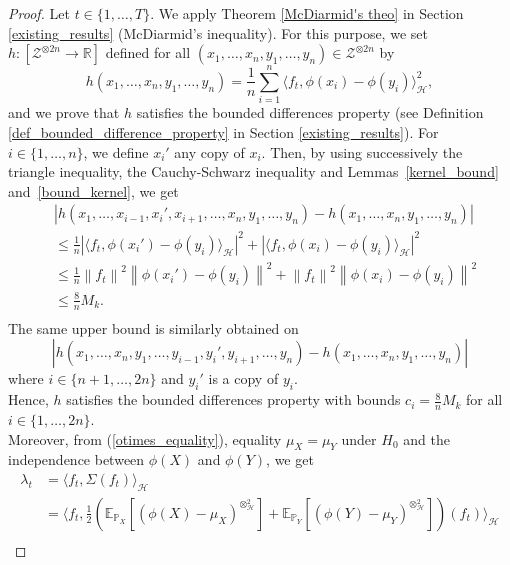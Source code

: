 \documentclass[twoside,11pt]{article}
\newcommand{\Hk}{\mathcal{H}}
\newcommand{\nb}{n}
\newcommand{\R}{\mathbb{R}}%
\newcommand{\PP}{\mathbb{P}}%
\newcommand{\EE}{\mathbb{E}}%
\begin{document}
\begin{proof}
Let $t \in \{1,\ldots,T\}$. We apply Theorem \ref{McDiarmid's theo} in Section \ref{existing_results} (McDiarmid's inequality). For this purpose, we set $h : [\mathcal{Z}^{\otimes 2\nb} \longrightarrow \R]$ defined for all $ \left(x_1,\ldots,x_{\nb},y_1,\ldots,y_{\nb}\right) \in \mathcal{Z}^{\otimes 2\nb}$ by 
$$  h\left(x_1,\ldots,x_{\nb},y_1,\ldots,y_{\nb}\right) =  \frac{1}{\nb} \underset{i=1}{\overset{\nb}{\sum}} \langle f_t, \phi(x_i) - \phi(y_i)  \rangle_{\Hk}^2,$$
and we prove that $h$ satisfies the bounded differences property (see Definition \ref{def_bounded_difference_property} in Section \ref{existing_results}). 
For $i \in \{1,\ldots,\nb\}$, we define $x_i'$ any copy of $x_i$. Then, by using successively the triangle inequality, the Cauchy-Schwarz inequality and Lemmas~\ref{kernel_bound} and~\ref{bound_kernel}, we get 
\begin{align*}
    & \left | h\left(x_1,\ldots,x_{i-1},x_i',x_{i+1},\ldots,x_{\nb},y_1,\ldots,y_{\nb}\right) - h\left(x_1,\ldots,x_{\nb},y_1,\ldots,y_{\nb}\right) \right | \\
    &\leq \frac{1}{\nb} \left | \langle f_t, \phi(x_i') - \phi(y_i)  \rangle_{\Hk} \right |^2 + \left | \langle f_t, \phi(x_i) - \phi(y_i)  \rangle_{\Hk} \right |^2 \\
    &\leq \frac{1}{\nb} \left \| f_t \right \|^2 \left \| \phi(x_i') - \phi(y_i)  \right \|^2 + \left \| f_t \right \|^2 \left \| \phi(x_i) - \phi(y_i)  \right \|^2 \\ 
    & \leq \frac{8}{\nb} M_k. \\
\end{align*}
The same upper bound is similarly obtained on $$\left | h\left(x_1,\ldots,x_{\nb},y_1,\ldots,y_{i-1},y_i',y_{i+1},\ldots,y_{\nb}\right) - h\left(x_1,\ldots,x_{\nb},y_1,\ldots,y_{\nb}\right) \right |$$ where $i \in \{\nb + 1,\ldots,2\nb\}$ and $y_i'$ is a copy of $y_i$. \\
Hence, $h$ satisfies the bounded differences property with bounds $c_i=\frac{8}{\nb} M_k$ for all $i \in \{1,\ldots,2 \nb \}$. \\
Moreover, from (\ref{otimes_equality}), equality $\mu_X = \mu_Y$ under $H_0$ and the independence between $\phi(X)$ and $\phi(Y)$, we get 
\begin{align*}
    \lambda_t
    &= \langle f_t, \Sigma (f_t) \rangle_{\Hk} \\
    & = \langle f_t, \frac 12 \left(\EE_{\PP_X} \left [ \left(\phi(X) - \mu_X \right)^{\otimes^2_{\Hk}} \right] +\EE_{\PP_Y} \left [ \left(\phi(Y) - \mu_Y \right)^{\otimes^2_{\Hk}} \right] \right)(f_t) \rangle_{\Hk} \\

\end{align*}
\end{proof}
\end{document}
